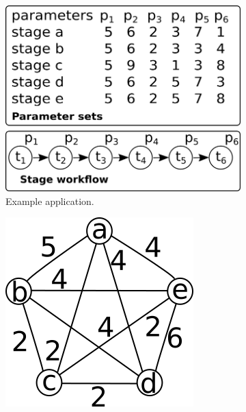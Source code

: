 \begin{figure}[!h]
	 \centering
	 \begin{subfigure}[b]{0.3\textwidth}
			\centering
			 \includegraphics[width=\textwidth]{img/sca0.png}
			 \caption{Example application.}
			 \label{fig:sca0}
	 \end{subfigure}
	 \hspace{3mm}
	 \begin{subfigure}[b]{0.3\textwidth}
			\centering
			 \includegraphics[width=\textwidth]{img/sca1.png}

\end{subfigure}
\end{figure}
